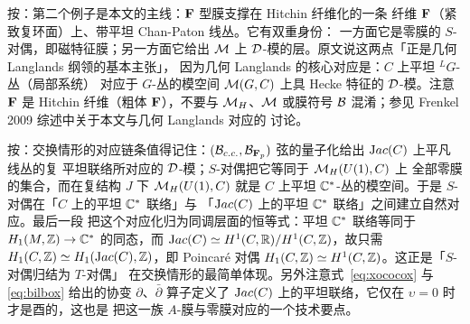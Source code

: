 \begin{yizhu}[物理图像]
按：第二个例子是本文的主线：$\CMF$ 型膜支撑在 Hitchin 纤维化的一条
纤维 $\CMF$（紧致复环面）上、带平坦 Chan-Paton 线丛。它有双重身份：
一方面它是零膜的 $S$-对偶，即磁特征膜；另一方面它给出 $\M$ 上
${\cal D}$-模的层。原文说这两点「正是几何 Langlands 纲领的基本主张」，
因为几何 Langlands 的核心对应是：$C$ 上平坦 ${}^L G$-丛（局部系统）
对应于 $G$-丛的模空间 $\M(G,C)$ 上具 Hecke 特征的 ${\cal D}$-模。注意 $\CMF$ 是
Hitchin 纤维（粗体 $\cmmib F$），不要与 $\MH$、$\M$ 或膜符号
${\cal B}$ 混淆；参见 Frenkel 2009 综述中关于本文与几何 Langlands 对应的
讨论。
\end{yizhu}

\begin{yizhu}[物理图像]
按：交换情形的对应链条值得记住：$({\cal B}_{c.c.},
{\cal B}_{{\CMF}_p})$ 弦的量子化给出 ${\rm Jac}(C)$ 上平凡线丛的复
平坦联络所对应的 ${\cal D}$-模；$S$-对偶把它等同于 $\MH(U(1),C)$ 上
全部零膜的集合，而在复结构 $J$ 下 $\MH(U(1),C)$ 就是 $C$ 上平坦
$\CC^*$-丛的模空间。于是 $S$-对偶在「$C$ 上的平坦 $\CC^*$ 联络」与
「${\rm Jac}(C)$ 上的平坦 $\CC^*$ 联络」之间建立自然对应。最后一段
把这个对应化归为同调层面的恒等式：平坦 $\CC^*$ 联络等同于
$H_1(M,\Bbb{Z})\to\CC^*$ 的同态，而
${\rm Jac}(C)\simeq H^1(C,\RR)/H^1(C,\Bbb{Z})$，故只需
$H_1(C,\Bbb{Z})\simeq H_1({\rm Jac}(C),\Bbb{Z})$，即 Poincaré 对偶
$H_1(C,\Bbb{Z})\simeq H^1(C,\Bbb{Z})$。这正是「$S$-对偶归结为 $T$-对偶」
在交换情形的最简单体现。另外注意式~\eqref{eq:xococox} 与
\eqref{eq:bilbox} 给出的协变 $\partial$、$\bar\partial$ 算子定义了
${\rm Jac}(C)$ 上的平坦联络，它仅在 $\upsilon=0$ 时才是酉的，这也是
把这一族 $A$-膜与零膜对应的一个技术要点。
\end{yizhu}
